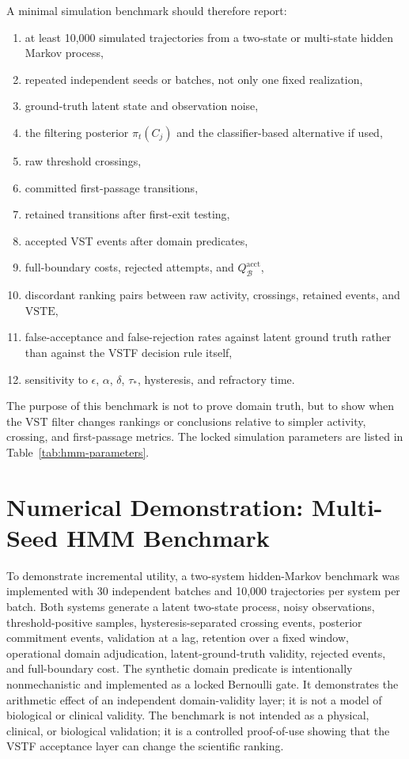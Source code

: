 \documentclass[11pt,a4paper]{article}
\newcommand{\VSTE}{\ensuremath{\mathrm{VSTE}}}
\newcommand{\1}{\mathbf{1}}
\begin{document}
A minimal simulation benchmark should therefore report:
\begin{enumerate}
  \item at least 10,000 simulated trajectories from a two-state or multi-state hidden Markov process,
  \item repeated independent seeds or batches, not only one fixed realization,
  \item ground-truth latent state and observation noise,
  \item the filtering posterior $\pi_t(C_j)$ and the classifier-based alternative if used,
  \item raw threshold crossings,
  \item committed first-passage transitions,
  \item retained transitions after first-exit testing,
  \item accepted VST events after domain predicates,
  \item full-boundary costs, rejected attempts, and $Q_{\mathcal{B}}^{\mathrm{acct}}$,
  \item discordant ranking pairs between raw activity, crossings, retained events, and \VSTE{},
  \item false-acceptance and false-rejection rates against latent ground truth rather than against the VSTF decision rule itself,
  \item sensitivity to $\epsilon$, $\alpha$, $\delta$, $\tau_\ast$, hysteresis, and refractory time.
\end{enumerate}

The purpose of this benchmark is not to prove domain truth, but to show when the VST filter changes rankings or conclusions relative to simpler activity, crossing, and first-passage metrics. The locked simulation parameters are listed in Table~\ref{tab:hmm-parameters}.

\section{Numerical Demonstration: Multi-Seed HMM Benchmark}

To demonstrate incremental utility, a two-system hidden-Markov benchmark was implemented with 30 independent batches and 10,000 trajectories per system per batch. Both systems generate a latent two-state process, noisy observations, threshold-positive samples, hysteresis-separated crossing events, posterior commitment events, validation at a lag, retention over a fixed window, operational domain adjudication, latent-ground-truth validity, rejected events, and full-boundary cost. The synthetic domain predicate is intentionally nonmechanistic and implemented as a locked Bernoulli gate. It demonstrates the arithmetic effect of an independent domain-validity layer; it is not a model of biological or clinical validity. The benchmark is not intended as a physical, clinical, or biological validation; it is a controlled proof-of-use showing that the VSTF acceptance layer can change the scientific ranking.
\end{document}
